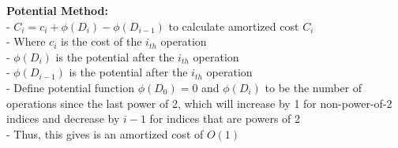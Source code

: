 \documentclass[letterpaper,12pt]{article}
\begin{document}
\begin{enumerate}
\textbf{Potential Method:} \\
- $C_i = c_i + \phi(D_i) -\phi(D_{i-1})$ to calculate amortized cost $C_i$ \\
- Where $c_i$ is the cost of the $i_{th}$ operation \\
- $\phi(D_i)$ is the potential after the $i_{th}$ operation \\
- $\phi(D_{i-1})$ is the potential after the $i_{th}$ operation \\
- Define potential function $\phi(D_0) = 0$ and $\phi(D_i)$ to be the number of operations since the last power of 2, which will increase by 1 for non-power-of-2 indices and decrease by $i-1$ for indices that are powers of 2 \\
- Thus, this gives is an amortized cost of $O(1)$

\end{enumerate}
\end{document}
